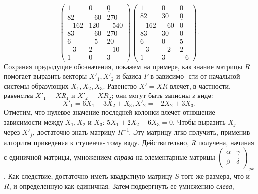 	$$\begin{pmatrix} 1 & 0 & \underline{0} \\ 82 & -60 & 270 \\ -162 & 120 & -540 \\ 83 & -60 & 270 \\ 6 & -5 & 20 \\ -3 & 2 & -10 \\ 1 & 0 & 3\end{pmatrix}\begin{pmatrix} 1 & 0 & 0 \\ 82 & 30 & \underline{0} \\ -162 & -60 & 0 \\ 83 & 30 & 0 \\ 6 & 0 & 5 \\ -3 & -2 & 2 \\ 1 & 3 & -6\end{pmatrix}.$$
	Сохраняя предыдущие обозначения, покажем на примере, как знание\linebreak
	матрицы $R$ помогает выразить векторы $X'_1, X'_2$ и  базиса $F$ в зависимо-\linebreak
	сти от начальной системы образующих $X_1, X_2, X_3$. Равенство $X' = XR$\linebreak
	влечет, в частности, равенства $X'_1 = XR_1$ и $X'_2 = XR_2$; они могут быть\linebreak
	записны в виде:
	$$X'_1 = 6X_1 - 3X_2 + X_3, X'_2 = -2X_2 + 3X_3.$$
	Отметим, что нулевое значение последней колонки влечет отношение\linebreak
	зависимости между $X_1, X_2$ и $X_3$:
	$5X_1 + 2X_2 - 6X_3 = 0.$
	Чтобы выразить $X_j$ через $X'_j$, достаточно знать матрицу $R^{-1}$. Эту\linebreak
	матрицу лгко получить, применив алгоритм приведения к ступенча-\linebreak
	тому виду. Действительно, $R$ получена, начиная с единичной матрицы,\linebreak
	умножением {\it справа} на элементарные матрицы {\scriptsize $\begin{pmatrix} \alpha & \gamma \\ \beta & \delta \end{pmatrix}_{jk}$}. Как следствие,\linebreak
	достаточно иметь квадратную матрицу $S$ того же размера, что и $R$, и\linebreak
	определенную как единичная. Затем подвергнуть ее умножению {\it слева},\linebreak
